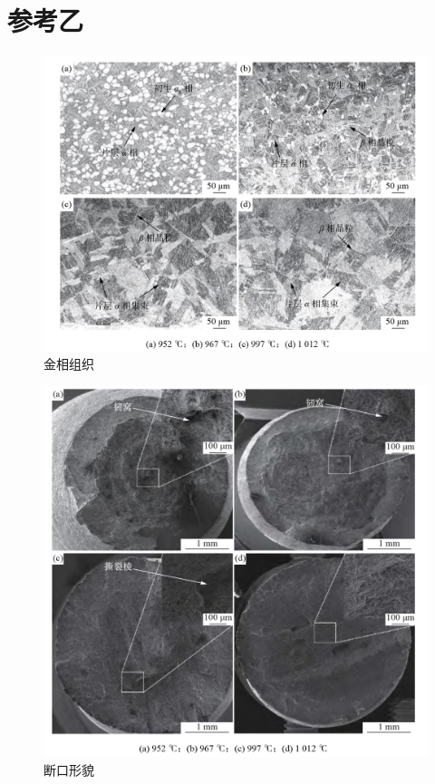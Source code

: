 \documentclass[
class = book,
zihao = -4,
font = noto,
paper = a4paper,
openany
]{easybook}
\newcommand{\ti}{Ti6Al4V}
\begin{document}
\section{参考乙}
	\begin{table}[htbp]
	\centering
	\label{sec:my1HT}
	\caption{\ti 热处理工艺与性能汇总表\cite{RanXingGuRongWenDuDuiTi6Al4VELITaiHeJinXianWeiZuZhiJiXingNengDeYingXiang2021}}
\end{table}
\begin{figure}[h!]
	\centering
	\includegraphics[width=0.7\linewidth]{金相_乙}
	\caption{金相组织}
	\label{fig:}
\end{figure}
\begin{figure}[h!]
	\centering
	\includegraphics[width=0.7\linewidth]{断口_乙}
	\caption{断口形貌}
	\label{fig:}
\end{figure}
\end{document}
